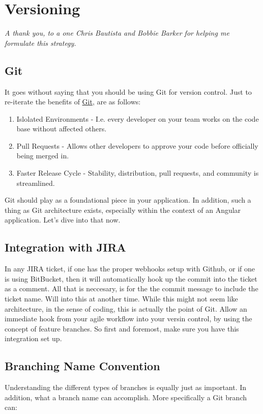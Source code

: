 \chapter{ Versioning }

\textit{A thank you, to a one Chris Bautista and Bobbie Barker for helping me formulate this strategy.}
\section { Git }
It goes without saying that you should be using Git for version control. Just to re-iterate the benefits of \href{https://git-scm.com/}{Git}, are as follows: 
\begin{enumerate} 
  \item Islolated Environments - I.e. every developer on your team works on the code base without affected others. 
  \item Pull Requests - Allows other developers to approve your code before officially being merged in. 
  \item Faster Release Cycle - Stability, distribution, pull requests, and community is streamlined. 
\end{enumerate} 

Git should play as a foundational piece in your application. In addition, such a thing as Git architecture exists, especially within the context of an Angular application. Let's dive into that now. 

\section { Integration with JIRA }
In any JIRA ticket, if one has the proper webhooks setup with Github, or if one
is using BitBucket, then it will automatically hook up the commit into the
ticket as a comment. All that is neccesary, is for the the commit message to include the ticket name. Will into this at another time. While this might not seem like architecture, in the sense of coding, this is actually the point of Git. Allow an immediate hook from your agile workflow into your versin control, by using the concept of feature branches. So first and foremost, make sure you have this integration set up. 

\section { Branching Name Convention }
Understanding the different types of branches is equally just as important. In addition, what a branch name can accomplish. More specifically a Git branch can:

